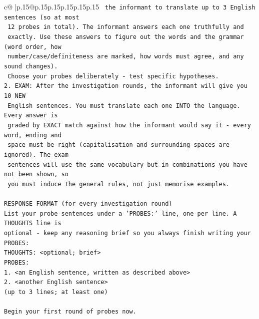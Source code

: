 \documentclass{article}
\begin{document}
{\begin{supertabular}{c@{$\;$}|p{.15\linewidth}@{}p{.15\linewidth}p{.15\linewidth}p{.15\linewidth}p{.15\linewidth}p{.15\linewidth}}
{{{\texttt{   the informant to translate up to 3 English sentences (so at most} \\
\texttt{   12 probes in total). The informant answers each one truthfully and} \\
\texttt{   exactly. Use these answers to figure out the words and the grammar (word order, how} \\
\texttt{   number/case/definiteness are marked, how words must agree, and any sound changes).} \\
\texttt{   Choose your probes deliberately {-} test specific hypotheses.} \\
\texttt{2. EXAM: After the investigation rounds, the informant will give you 10 NEW} \\
\texttt{   English sentences. You must translate each one INTO the language. Every answer is} \\
\texttt{   graded by EXACT match against how the informant would say it {-} every word, ending and} \\
\texttt{   space must be right (capitalisation and surrounding spaces are ignored). The exam} \\
\texttt{   sentences will use the same vocabulary but in combinations you have not been shown, so} \\
\texttt{   you must induce the general rules, not just memorise examples.} \\
\\ 
\texttt{RESPONSE FORMAT (for every investigation round)} \\
\texttt{List your probe sentences under a 'PROBES:' line, one per line. A THOUGHTS line is} \\
\texttt{optional {-} keep any reasoning brief so you always finish writing your PROBES:} \\
\texttt{THOUGHTS: <optional; brief>} \\
\texttt{PROBES:} \\
\texttt{1. <an English sentence, written as described above>} \\
\texttt{2. <another English sentence>} \\
\texttt{(up to 3 lines; at least one)} \\
\\ 
\texttt{Begin your first round of probes now.} \\
            }
        }
    }
     \\ \\


\end{supertabular}}
\end{document}
